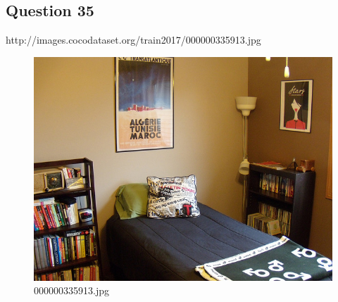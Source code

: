     \subsection*{Question 35}
    http://images.cocodataset.org/train2017/000000335913.jpg
    \begin{figure}[h]
        \centering
        \includegraphics[width=0.8\linewidth]{../image set/easy/000000335913.jpg}
        \caption{000000335913.jpg}
    \end{figure}
